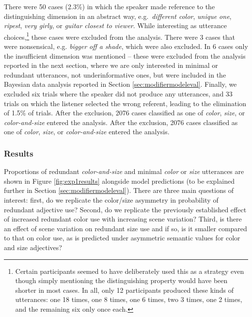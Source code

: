 \documentclass[11pt]{article}
\newcommand{\figref}[1]{Figure \ref{#1}}
\newcommand{\sectionref}[1]{Section \ref{#1}}
\begin{document}
There were 50 cases (2.3\%) in which the speaker made reference to the distinguishing dimension in an abstract way, e.g.~\emph{different color}, \emph{unique one}, \emph{ripest}, \emph{very girly}, or \emph{guitar closest to viewer}. While interesting as utterance choices,\footnote{Certain participants seemed to have deliberately used this as a strategy even though simply mentioning the distinguishing property would have been shorter in most cases. In all, only 12 participants produced these kinds of utterances: one 18 times, one 8 times, one 6 times, two 3 times, one 2 times, and the remaining six only once each.} these cases were excluded from the analysis. There were 3 cases that were nonsensical, e.g. \emph{bigger off a shade}, which were also excluded. In 6 cases only the insufficient dimension was mentioned -- these were excluded from the analysis reported in the next section, where we are only interested in minimal or redundant utterances, not underinformative ones, but were included in the Bayesian data analysis reported in \sectionref{sec:modifiermodeleval}. Finally, we excluded six trials where the speaker did not produce any utterances, and 33 trials on which the listener selected the wrong referent, leading to the elimination of 1.5\% of trials. After the exclusion, 2076 cases classified as one of \emph{color}, \emph{size}, or \emph{color-and-size} entered the analysis. After the exclusion, 2076 cases classified as one of \emph{color}, \emph{size}, or \emph{color-and-size} entered the analysis.

\subsubsection{Results}
\label{sec:modelempiricalresults}

Proportions of redundant \emph{color-and-size} and minimal \emph{color} or \emph{size} utterances are shown in \figref{fig:exp1results} alongside model predictions (to be explained further in \sectionref{sec:modifiermodeleval}). There are three main questions of interest: first, do we replicate the color/size asymmetry in probability of redundant adjective use? Second, do we replicate the previously established effect of increased redundant color use with increasing scene variation? Third, is there an effect of scene variation on redundant size use and if so, is it smaller compared to that on color use, as is predicted under asymmetric semantic values for color and size adjectives?
\end{document}
